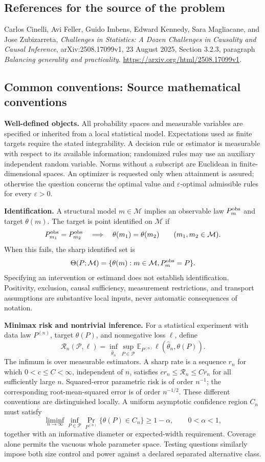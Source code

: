\documentclass[11pt,a4paper]{article}
\newcommand{\E}{\mathbb E}
\begin{document}
\subsection*{References for the source of the problem}
Carlos Cinelli, Avi Feller, Guido Imbens, Edward Kennedy, Sara Magliacane, and Jose Zubizarreta, \emph{Challenges in Statistics: A Dozen Challenges in Causality and Causal Inference}, arXiv:2508.17099v1, 23 August 2025, Section 3.2.3, paragraph \emph{Balancing generality and practicality}. \url{https://arxiv.org/html/2508.17099v1}.

\subsection*{Common conventions: Source mathematical conventions}

\textbf{Well-defined objects.}
All probability spaces and measurable variables are specified or inherited
from a local statistical model. Expectations used as finite targets require
the stated integrability. A decision rule or estimator is measurable with
respect to its available information; randomized rules may use an auxiliary
independent random variable. Norms without a subscript are Euclidean in
finite-dimensional spaces. An optimizer is requested only when attainment
is assured; otherwise the question concerns the optimal value and
$\varepsilon$-optimal admissible rules for every $\varepsilon>0$.

\textbf{Identification.}
A structural model $m\in\mathcal M$ implies an observable law
$P_m^{\rm obs}$ and target $\theta(m)$. The target is point identified on
$\mathcal M$ if
\[
 P_{m_1}^{\rm obs}=P_{m_2}^{\rm obs}
 \quad\Longrightarrow\quad\theta(m_1)=\theta(m_2)
 \qquad(m_1,m_2\in\mathcal M).
\]
When this fails, the sharp identified set is
\[
 \Theta(P;\mathcal M)=\{\theta(m):m\in\mathcal M,
                                  P_m^{\rm obs}=P\}.
\]
Specifying an intervention or estimand does not establish identification.
Positivity, exclusion, causal sufficiency, measurement restrictions, and
transport assumptions are substantive local inputs, never automatic
consequences of notation.

\textbf{Minimax risk and nontrivial inference.}
For a statistical experiment with data law $P^{(n)}$, target $\theta(P)$,
and nonnegative loss $\ell$, define
\[
 \mathcal R_n(\mathcal P,\ell)
   =\inf_{\widehat\theta_n}\sup_{P\in\mathcal P}
      \E_{P^{(n)}}\ell(\widehat\theta_n,\theta(P)).
\]
The infimum is over measurable estimators. A sharp rate is a sequence
$r_n$ for which $0<c\leq C<\infty$, independent of $n$, satisfies
$c r_n\leq\mathcal R_n\leq C r_n$ for all sufficiently large $n$.
Squared-error parametric risk is of order $n^{-1}$; the corresponding
root-mean-squared error is of order $n^{-1/2}$. These different conventions
are distinguished locally. A uniform asymptotic confidence region $C_n$
must satisfy
\[
 \liminf_{n\to\infty}\inf_{P\in\mathcal P}
     \Pr_{P^{(n)}}\{\theta(P)\in C_n\}\geq 1-\alpha,
 \qquad 0<\alpha<1,
\]
together with an informative diameter or expected-width requirement.
Coverage alone permits the vacuous whole parameter space. Testing questions
similarly impose both size control and power against a declared separated
alternative class.
\end{document}
